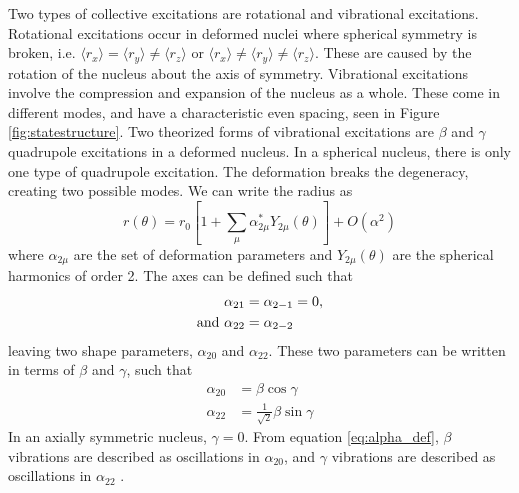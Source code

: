 Two types of collective excitations are rotational and vibrational excitations. Rotational excitations occur in deformed nuclei where spherical symmetry is broken, i.e. $\langle r_x \rangle=\langle r_y \rangle \neq \langle r_z \rangle$ or $\langle r_x \rangle \neq \langle r_y \rangle \neq \langle r_z \rangle$. These are caused by the rotation of the nucleus about the axis of symmetry. Vibrational excitations involve the compression and expansion of the nucleus as a whole. These come in different modes, and have a characteristic even spacing, seen in Figure \ref{fig:statestructure}. Two theorized forms of vibrational excitations are $\beta$ and $\gamma$ quadrupole excitations in a deformed nucleus\citep{rowe10:_collective}. In a spherical nucleus, there is only one type of quadrupole excitation. The deformation breaks the degeneracy, creating two possible modes. We can write the radius as
\begin{equation}
    r(\theta)=r_{0} \left[ 1+\sum_{\mu}\alpha_{2\mu}^{*}Y_{2\mu}(\theta) \right] + O(\alpha^{2})
\end{equation}
where $\alpha_{2\mu}$ are the set of deformation parameters and $Y_{2\mu}(\theta)$ are the spherical harmonics of order 2. The axes can be defined such that
\begin{equation}
    \begin{split}
        \alpha_{21}&=\alpha_{2{-1}}=0,\\
        \textnormal{and }\alpha_{22}&=\alpha_{2{-2}}
    \end{split}
\end{equation}
leaving two shape parameters, $\alpha_{20}$ and $\alpha_{22}$. These two parameters can be written in terms of $\beta$ and $\gamma$, such that
\begin{equation}
    \label{eq:alpha_def}
    \begin{split}
        \alpha_{20}&=\beta \cos\gamma\\
        \alpha_{22}&=\frac{1}{\sqrt{2}}\beta \sin\gamma
    \end{split}
\end{equation}
In an axially symmetric nucleus, $\gamma=0$. From equation \ref{eq:alpha_def}, $\beta$ vibrations are described as oscillations in $\alpha_{20}$, and $\gamma$ vibrations are described as oscillations in $\alpha_{22}$ \citep{rowe10:_collective}.



